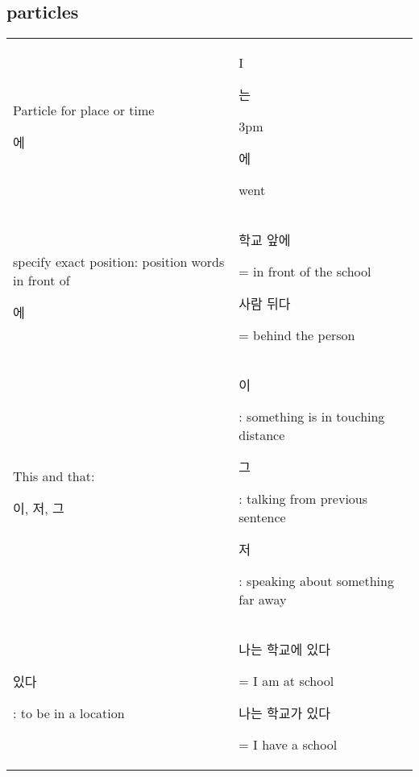 	



\subsection{particles}

\begin{tabular}{p{200pt}p{200pt}}
\hline
	Particle for place or time \begin{Korean}에\end{Korean} &
	I\begin{Korean}는\end{Korean} 3pm \begin{Korean}에\end{Korean} went\\

	specify exact position: position words in front of \begin{Korean}에\end{Korean} &
	\begin{Korean}학교 앞에\end{Korean} = in front of the school\newline
	\begin{Korean}사람 뒤다\end{Korean} = behind the person\\
\hline
	This and that: \begin{Korean}이, 저, 그\end{Korean}&
	\begin{Korean}이\end{Korean}: something is in touching distance\newline
	\begin{Korean}그\end{Korean}: talking from previous sentence\newline
	\begin{Korean}저\end{Korean}: speaking about something far away\\
\hline
	 \begin{Korean}있다\end{Korean}: to be in a location&
	 \begin{Korean}나는 학교에 있다\end{Korean} = I am at school\newline
	 \begin{Korean}나는 학교가 있다\end{Korean} = I have a school\\
\hline		

\end{tabular}

